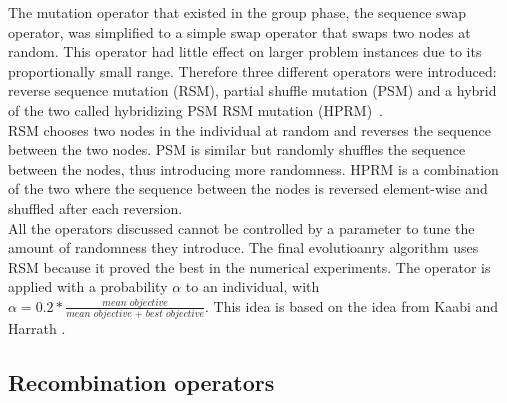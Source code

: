 \documentclass[a4paper,10pt]{article}
\newcommand{\ReplaceMe}[1]{{\color{blue}#1}}
\begin{document}
The mutation operator that existed in the group phase, the sequence swap operator, was simplified to a simple swap operator that swaps two nodes at random. This operator had little effect on larger problem instances due to its proportionally small range. Therefore three different operators were introduced: reverse sequence mutation (RSM), partial shuffle mutation (PSM) and a hybrid of the two called hybridizing PSM RSM mutation (HPRM)~\cite{hprm}.\\
RSM chooses two nodes in the individual at random and reverses the sequence between the two nodes. PSM is similar but randomly shuffles the sequence between the nodes, thus introducing more randomness. HPRM is a combination of the two where the sequence between the nodes is reversed element-wise and shuffled after each reversion.\\
All the operators discussed cannot be controlled by a parameter to tune the amount of randomness they introduce. The final evolutioanry algorithm uses RSM because it proved the best in the numerical experiments. The operator is applied with a probability $\alpha$ to an individual, with $\alpha = 0.2 *\frac{ \textit{mean objective}}{\textit{mean objective } + \textit{ best objective}}$. This idea is based on the idea from Kaabi and Harrath \cite{ann}. 

\subsection{Recombination operators}

\end{document}

